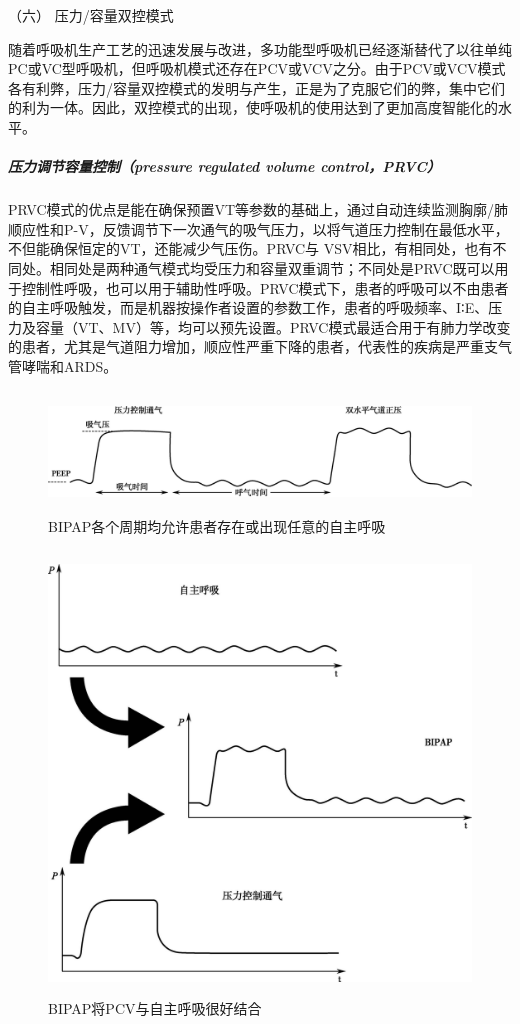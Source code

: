 \hypertarget{text00368.htmlux5cux23CHP16-3-2-1-6}{}
（六） 压力/容量双控模式

随着呼吸机生产工艺的迅速发展与改进，多功能型呼吸机已经逐渐替代了以往单纯PC或VC型呼吸机，但呼吸机模式还存在PCV或VCV之分。由于PCV或VCV模式各有利弊，压力/容量双控模式的发明与产生，正是为了克服它们的弊，集中它们的利为一体。因此，双控模式的出现，使呼吸机的使用达到了更加高度智能化的水平。

\subparagraph{压力调节容量控制（pressure regulated volume control，PRVC）}

PRVC模式的优点是能在确保预置VT等参数的基础上，通过自动连续监测胸廓/肺顺应性和P-V，反馈调节下一次通气的吸气压力，以将气道压力控制在最低水平，不但能确保恒定的VT，还能减少气压伤。PRVC与
VSV相比，有相同处，也有不同处。相同处是两种通气模式均受压力和容量双重调节；不同处是PRVC既可以用于控制性呼吸，也可以用于辅助性呼吸。PRVC模式下，患者的呼吸可以不由患者的自主呼吸触发，而是机器按操作者设置的参数工作，患者的呼吸频率、I∶E、压力及容量（VT、MV）等，均可以预先设置。PRVC模式最适合用于有肺力学改变的患者，尤其是气道阻力增加，顺应性严重下降的患者，代表性的疾病是严重支气管哮喘和ARDS。

\begin{figure}[!htbp]
 \centering
 \includegraphics[width=5.88542in,height=1.27083in]{./images/Image00513.jpg}
 \captionsetup{justification=centering}
 \caption{BIPAP各个周期均允许患者存在或出现任意的自主呼吸}
 \label{fig136-7}
  \end{figure} 

\begin{figure}[!htbp]
 \centering
 \includegraphics[width=4.6875in,height=4.625in]{./images/Image00514.jpg}
 \captionsetup{justification=centering}
 \caption{BIPAP将PCV与自主呼吸很好结合}
 \label{fig136-8}
  \end{figure} 

